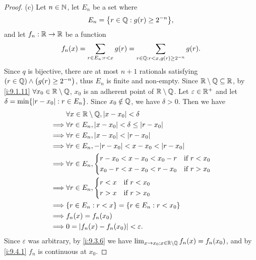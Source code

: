 \begin{proof}{(c)}
  Let \(n \in \mathbb{N}\), let \(E_n\) be a set where
  \[
    E_n = \set{r \in \Q : g(r) \geq 2^{-n}},
  \]
  and let \(f_n : \mathbb{R} \to \mathbb{R}\) be a function
  \[
    f_n(x) = \sum_{r \in E_n : r < x} g(r) = \sum_{r \in \mathbb{Q} : r < x, g(r) \geq 2^{-n}} g(r).
  \]
  Since \(q\) is bijective, there are at most \(n + 1\) rationals satisfying \((r \in \mathbb{Q}) \land \big(g(r) \geq 2^{-n}\big)\), thus \(E_n\) is finite and non-empty.
  Since \(\mathbb{R} \setminus \mathbb{Q} \subseteq \mathbb{R}\), by \cref{i:9.1.11} \(\forall x_0 \in \mathbb{R} \setminus \mathbb{Q}\), \(x_0\) is an adherent point of \(\mathbb{R} \setminus \mathbb{Q}\).
  Let \(\varepsilon \in \mathbb{R}^+\) and let \(\delta = \min\set{\abs{r - x_0} : r \in E_n}\).
  Since \(x_0 \notin \mathbb{Q}\), we have \(\delta > 0\).
  Then we have
  \begin{align*}
             & \forall x \in \R \setminus \Q, \abs{x - x_0} < \delta               \\
    \implies & \forall r \in E_n, \abs{x - x_0} < \delta \leq \abs{r - x_0}        \\
    \implies & \forall r \in E_n, \abs{x - x_0} < \abs{r - x_0}                    \\
    \implies & \forall r \in E_n, -\abs{r - x_0} < x - x_0 < \abs{r - x_0}         \\
    \implies & \forall r \in E_n, \begin{dcases}
                                    r - x_0 < x - x_0 < x_0 - r & \text{if } r < x_0 \\
                                    x_0 - r < x - x_0 < r - x_0 & \text{if } r > x_0
                                  \end{dcases} \\
    \implies & \forall r \in E_n, \begin{dcases}
                                    r < x & \text{if } r < x_0 \\
                                    r > x & \text{if } r > x_0
                                  \end{dcases}                       \\
    \implies & \set{r \in E_n : r < x} = \set{r \in E_n : r < x_0}                 \\
    \implies & f_n(x) = f_n(x_0)                                                   \\
    \implies & 0 = \abs{f_n(x) - f_n(x_0)} < \varepsilon.
  \end{align*}
  Since \(\varepsilon\) was arbitrary, by \cref{i:9.3.6} we have \(\lim_{x \to x_0 ; x \in \mathbb{R} \setminus \mathbb{Q}} f_n(x) = f_n(x_0)\), and by \cref{i:9.4.1} \(f_n\) is continuous at \(x_0\).


\end{proof}
